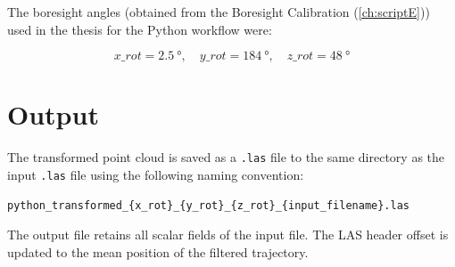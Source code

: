 The boresight angles (obtained from the Boresight Calibration (\autoref{ch:scriptE})) used in the thesis for the Python workflow were:

\begin{equation*}
    x\_rot = \qty{2.5}{\degree}, \quad y\_rot = \qty{184}{\degree}, \quad z\_rot = \qty{48}{\degree}
\end{equation*}

\section{Output}

The transformed point cloud is saved as a \texttt{.las} file to the same directory as the input \texttt{.las} file using the following naming convention:

\begin{verbatim}
python_transformed_{x_rot}_{y_rot}_{z_rot}_{input_filename}.las
\end{verbatim}

The output file retains all scalar fields of the input file. The LAS header offset is updated to the mean position of the filtered trajectory.